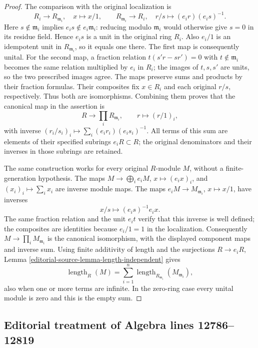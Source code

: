 \begin{proof}
The comparison with the original localization is
$$
R_i\longrightarrow R_{\mathfrak m_i},\quad x\longmapsto x/1,
\qquad
R_{\mathfrak m_i}\longrightarrow R_i,\quad
r/s\longmapsto (e_ir)(e_is)^{-1}.
$$
Here $s\notin\mathfrak m_i$ implies
$e_is\notin e_i\mathfrak m_i$: reducing modulo
$\mathfrak m_i$ would otherwise give $s=0$ in its residue
field. Hence $e_is$ is a unit in the original ring $R_i$.
Also $e_i/1$ is an idempotent unit in $R_{\mathfrak m_i}$,
so it equals one there. The first map is consequently unital.
For the second map, a fraction relation
$t(s'r-sr')=0$ with $t\notin\mathfrak m_i$ becomes the
same relation multiplied by $e_i$ in $R_i$; the images of
$t,s,s'$ are units, so the two prescribed images agree.
The maps preserve sums and products by their fraction formulas.
Their composites fix $x\in R_i$ and each original $r/s$,
respectively. Thus both are isomorphisms.
Combining them proves that the canonical map in the assertion is
$$
R\longrightarrow\prod_i R_{\mathfrak m_i},\qquad r\longmapsto(r/1)_i,
$$
with inverse
$(r_i/s_i)_i\mapsto\sum_i(e_ir_i)(e_is_i)^{-1}$.
All terms of this sum are elements of their specified subrings
$e_iR\subset R$; the original denominators and their inverses
in those subrings are retained.

The same construction works for every original $R$-module $M$,
without a finite-generation hypothesis. The maps
$M\to\bigoplus_i e_iM$, $x\mapsto(e_ix)_i$, and
$(x_i)_i\mapsto\sum_i x_i$ are inverse module maps.
The maps $e_iM\to M_{\mathfrak m_i}$, $x\mapsto x/1$,
have inverses
$$
x/s\longmapsto(e_is)^{-1}e_ix.
$$
The same fraction relation and the unit $e_it$ verify that this
inverse is well defined; the composites are identities because
$e_i/1=1$ in the localization.
Consequently $M\to\prod_i M_{\mathfrak m_i}$ is the canonical
isomorphism, with the displayed component maps and inverse sum.
Using finite additivity of length and the surjections
$R\to e_iR$, Lemma \ref{editorial-source-lemma-length-independent} gives
$$
\operatorname{length}_R(M)
=\sum_{i=1}^n\operatorname{length}_{R_{\mathfrak m_i}}
 (M_{\mathfrak m_i}),
$$
also when one or more terms are infinite. In the zero-ring case
every unital module is zero and this is the empty sum.
\end{proof}


\subsection{Editorial treatment of Algebra lines 12786--12819}

